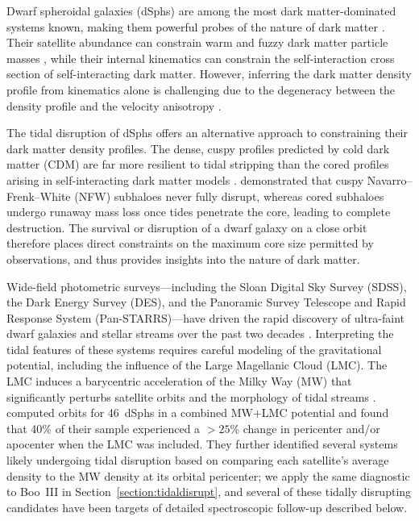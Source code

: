 \documentclass[twocolumn]{aastex631}
\begin{document}
Dwarf spheroidal galaxies (dSphs) are among the most dark matter-dominated systems known, making them powerful probes of the nature of dark matter \citep[see, e.g.,][]{Bullock2017ARAA}.
Their satellite abundance can constrain warm and fuzzy dark matter particle masses \citep{Nadler2021}, while their internal kinematics can constrain the self-interaction cross section of self-interacting dark matter.
However, inferring the dark matter density profile from kinematics alone is challenging due to the degeneracy between the density profile and the velocity anisotropy \citep{Lokas2002, Guerra2023}.

The tidal disruption of dSphs offers an alternative approach to constraining their dark matter density profiles.
The dense, cuspy profiles predicted by cold dark matter (CDM) are far more resilient to tidal stripping than the cored profiles arising in self-interacting dark matter models \citep{Penarrubia2010}. \citet{Errani2023} demonstrated that cuspy Navarro--Frenk--White (NFW) subhaloes never fully disrupt, whereas cored subhaloes undergo runaway mass loss once tides penetrate the core, leading to complete destruction. The survival or disruption of a dwarf galaxy on a close orbit therefore places direct constraints on the maximum core size permitted by observations, and thus provides insights into the nature of dark matter.

Wide-field photometric surveys---including the Sloan Digital Sky Survey (SDSS), the Dark Energy Survey (DES), and the Panoramic Survey Telescope and Rapid Response System (Pan-STARRS)---have driven the rapid discovery of ultra-faint dwarf galaxies and stellar streams over the past two decades \citep[see][and references therein]{Simon2019, Koposov2015, Martin2015, Luque2017, Koposov2018, Torrealba2018, Homma2019, DrlicaWagner2020, Mau2020, Cerny2022, Cerny2023}. Interpreting the tidal features of these systems requires careful modeling of the gravitational potential, including the influence of the Large Magellanic Cloud (LMC). The LMC induces a barycentric acceleration of the Milky Way (MW) that significantly perturbs satellite orbits and the morphology of tidal streams \citep{Erkal2019, Erkal2020, Nadler2020}. \citet{Pace2022} computed orbits for 46~dSphs in a combined MW+LMC potential and found that 40\% of their sample experienced a $>25\%$ change in pericenter and/or apocenter when the LMC was included. They further identified several systems likely undergoing tidal disruption based on comparing each satellite's average density to the MW density at its orbital pericenter; we apply the same diagnostic to Boo~III in Section~\ref{section:tidaldisrupt}, and several of these tidally disrupting candidates have been targets of detailed spectroscopic follow-up described below.
\end{document}
